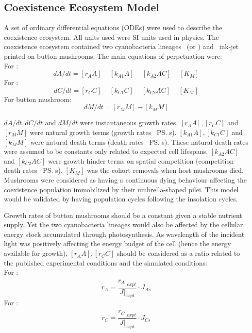 \documentclass[../thesis.tex]{subfiles} %
\begin{document}
\subsection{Coexistence Ecosystem Model}
A set of ordinary differential equations (ODEs) were used to describe the coexistence ecosystem.  All units used were SI units used in physics.  The coexistence ecosystem contained two cyanobacteria lineages \As\ (or \Ss) and \Cs\ ink-jet printed on button mushrooms.\autocite{joshi2018bacterial}  The main equations of perpetuation were:\\
For \As:
\begin{equation}
	dA/dt = [r_A A] - [k_{A1} A] - [k_{A2} A C] - [K_M]
\end{equation}
For \Cs:
\begin{equation}
	dC/dt = [r_C C] - [k_{C1} C] - [k_{C2} A C] - [K_M]
\end{equation}
For button mushroom:
\begin{equation}
	dM/dt = [r_M M] - [k_M M]
\end{equation}

$dA/dt, dC/dt$ and $dM/dt$ were instantaneous growth rates.  $[r_A A], [r_C C]$ and $[r_M M]$ were natural growth terms (growth rates \times\ \ps s).  $[k_{A1} A], [k_{C1} C]$ and $[k_M M]$ were natural death terms (death rates \times\ \ps s).  These natural death rates were assumed to be constants only related to expected cell lifespans.  $[k_{A2} A C]$ and $[k_{C2} A C]$ were growth hinder terms on spatial competition (competition death rates \times\ \ps s).  $[K_M]$ was the cohort removals when host mushrooms died.  Mushrooms were considered as having a continuous dying behaviour affecting the coexistence population immobilized by their umbrella-shaped pilei.  This model would be validated by having population cycles following the insolation cycles.

Growth rates of button mushrooms should be a constant given a stable nutrient supply.  Yet the two cyanobacteria lineages would also be affected by the cellular energy stock accumulated through photosynthesis.  As wavelength of the incident light was positively affecting the energy budget of the cell (hence the energy available for growth), $[r_A A], [r_C C]$ should be considered as a ratio related to the published experimental conditions and the simulated conditions:\\
For \As:
\begin{equation}
    r_A = \dfrac{r_A|_{expt}}{J|_{expt}}\cdot J_{As}
\end{equation}
For \Cs:
\begin{equation}
    r_C = \dfrac{r_C|_{expt}}{J|_{expt}}\cdot J_{Cs}
\end{equation}
\end{document}
